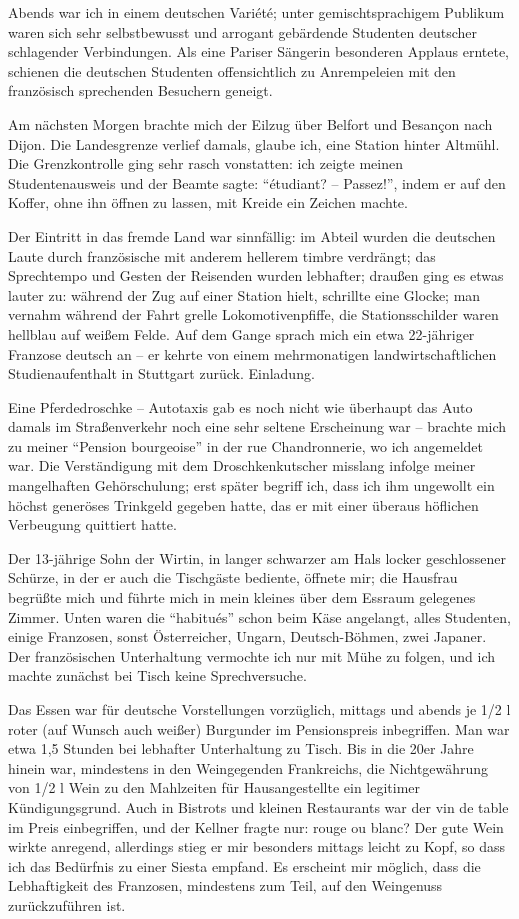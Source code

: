 \documentclass[a5paper,pagesize,10pt,twoside=true]{scrbook}
\renewcommand{\marginpar}[2][]{}
\begin{document}
Abends war ich in einem deutschen Variété; unter gemischtsprachigem Publikum waren sich sehr selbstbewusst und arrogant gebärdende Studenten deutscher schlagender Verbindungen. Als eine Pariser Sängerin besonderen Applaus erntete, schienen die deutschen Studenten offensichtlich zu Anrempeleien mit den französisch sprechenden Besuchern geneigt.

\marginpar{103}
Am nächsten Morgen brachte mich der Eilzug über Belfort und Besançon nach Dijon. Die Landesgrenze verlief damals, glaube ich, eine Station hinter Altmühl. Die Grenzkontrolle ging sehr rasch vonstatten: ich zeigte meinen Studentenausweis und der Beamte sagte: \enquote{étudiant? -- Passez!}, indem er auf den Koffer, ohne ihn öffnen zu lassen, mit Kreide ein Zeichen machte.

Der Eintritt in das fremde Land war sinnfällig: im Abteil wurden die deutschen Laute durch französische mit anderem hellerem timbre verdrängt; das Sprechtempo und Gesten der Reisenden wurden lebhafter; draußen ging es etwas lauter zu: während der Zug auf einer Station hielt, schrillte eine Glocke; man vernahm während der Fahrt grelle Lokomotivenpfiffe, die Stationsschilder waren hellblau auf weißem Felde. Auf dem Gange sprach mich ein etwa 22-jähriger Franzose deutsch an -- er kehrte von einem mehrmonatigen landwirtschaftlichen Studienaufenthalt in Stuttgart zurück. Einladung.

Eine Pferdedroschke -- Autotaxis gab es noch nicht wie überhaupt das Auto damals im Straßenverkehr noch eine sehr seltene Erscheinung war -- brachte mich zu meiner \enquote{Pension bourgeoise} in der rue Chandronnerie, wo ich angemeldet war. Die Verständigung mit dem Droschkenkutscher misslang infolge meiner mangelhaften Gehörschulung; erst später begriff ich, dass ich ihm ungewollt ein höchst generöses Trinkgeld gegeben hatte, das er mit einer überaus höflichen Verbeugung quittiert hatte.

Der 13-jährige Sohn der Wirtin, in langer schwarzer am Hals locker geschlossener Schürze, in der er auch die Tischgäste bediente, öffnete mir; die Hausfrau begrüßte mich und führte mich in mein kleines über dem Essraum gelegenes Zimmer. Unten waren die \enquote{habitués} schon beim Käse angelangt, alles Studenten, einige Franzosen, sonst Österreicher, Ungarn, Deutsch-Böhmen, zwei Japaner. Der französischen Unterhaltung vermochte ich nur mit Mühe zu folgen, und ich machte zunächst bei Tisch keine Sprechversuche.

\marginpar{105}
Das Essen war für deutsche Vorstellungen vorzüglich, mittags und abends je 1/2 l roter (auf Wunsch auch weißer) Burgunder im Pensionspreis inbegriffen. Man war etwa 1,5 Stunden bei lebhafter Unterhaltung zu Tisch. Bis in die 20er Jahre hinein war, mindestens in den Weingegenden Frankreichs, die Nichtgewährung von 1/2 l Wein zu den Mahlzeiten für Hausangestellte ein legitimer Kündigungsgrund. Auch in Bistrots und kleinen Restaurants war der vin de table im Preis einbegriffen, und der Kellner fragte nur: rouge ou blanc? Der gute Wein wirkte anregend, allerdings stieg er mir besonders mittags leicht zu Kopf, so dass ich das Bedürfnis zu einer Siesta empfand. Es erscheint mir möglich, dass die Lebhaftigkeit des Franzosen, mindestens zum Teil, auf den Weingenuss zurückzuführen ist.
\end{document}
